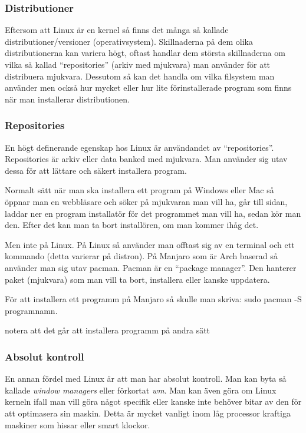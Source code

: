 \documentclass[12pt, a4paper]{report}
\begin{document}
    \subsubsection{Distributioner}

   Eftersom att Linux är en kernel så finns det många så kallade distributioner/versioner (operativsystem). Skillnaderna på dem olika distributionerna kan variera högt, oftast handlar dem största skillnaderna om vilka så kallad ``repositories'' (arkiv med mjukvara) man använder för att distribuera mjukvara. Dessutom så kan det handla om vilka filsystem man använder men också hur mycket eller hur lite förinstallerade program som finns när man installerar distributionen.

   \subsubsection{Repositories}

    En högt definerande egenskap hos Linux är användandet av ``repositories''. Repositories är arkiv eller data banked med mjukvara. Man använder sig utav dessa för att lättare och säkert installera program.

    Normalt sätt när man ska installera ett program på Windows eller Mac så öppnar man en webbläsare och söker på mjukvaran man vill ha, går till sidan, laddar ner en program installatör för det programmet man vill ha, sedan kör man den. Efter det kan man ta bort installören, om man kommer ihåg det.
    
    Men inte på Linux. På Linux så använder man offtast sig av en terminal och ett kommando (detta varierar på distron).
    På Manjaro som är Arch baserad så använder man sig utav pacman\cite{pacman}. Pacman är en ``package manager''\cite{pkgmanager}. Den hanterer paket (mjukvara) som man vill ta bort, installera eller kanske uppdatera.

    För att installera ett programm på Manjaro så skulle man skriva: sudo pacman -S programnamn. 

    \small{notera att det går att installera programm på andra sätt}


    \subsubsection{Absolut kontroll}

   En annan fördel med Linux är att man har absolut kontroll. Man kan byta så kallade \textit{window managers} eller förkortat \textit{wm}\cite{wm}. Man kan även göra om Linux kerneln ifall man vill göra något specifik eller kanske inte behöver bitar av den för att optimasera sin maskin. Detta är mycket vanligt inom låg processor kraftiga maskiner som hissar eller smart klockor.
\end{document}
